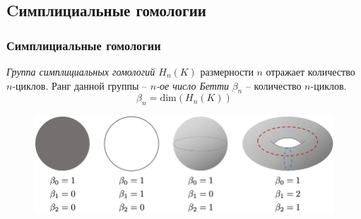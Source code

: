 \documentclass{beamer}
\begin{document}
		\subsection{Cимплициальные гомологии}
		\begin{frame}[fragile]
			\frametitle{Симплициальные гомологии}
			{\it Группа симплициальных гомологий $H_n(K)$} размерности $n$ отражает количество {$n$-циклов}. Ранг данной группы -- {\it $n$-ое число Бетти} $\beta_n$ -- количество $n$-циклов.
			\[
				\beta_n = \mathrm{dim}(H_n(K))
			\]
			
			\begin{figure}[!htbp]
				\centering
				\includegraphics[width=\linewidth, keepaspectratio=true]{betti_numbers.png}
			\end{figure}
		\end{frame}
		
\end{document}
